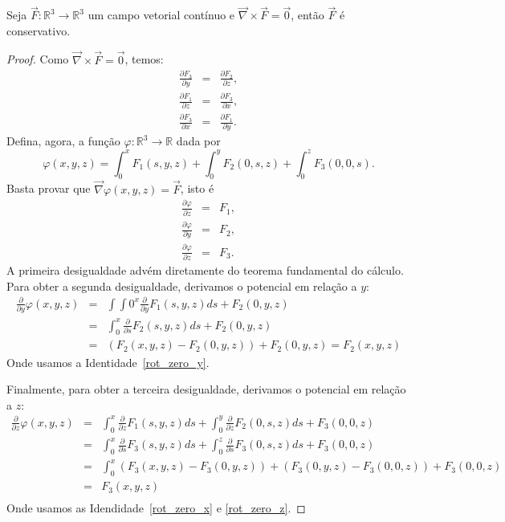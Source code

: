 \begin{teo} Seja $\vec{F}:\mathbb{R}^3\to\mathbb{R}^3$ um campo vetorial contínuo e $\vec{\nabla}\times \vec{F}=\vec{0}$, então $\vec{F}$ é conservativo.
 \end{teo}
\begin{proof} Como $\vec{\nabla}\times \vec{F}=\vec{0}$, temos:
\begin{eqnarray}
 \frac{\partial F_3}{\partial y} &=&\frac{\partial F_2}{\partial z}\label{rot_zero_x},\\
 \frac{\partial F_1}{\partial z} &=&\frac{\partial F_3}{\partial x}\label{rot_zero_y},\\
 \frac{\partial F_3}{\partial x} &=&\frac{\partial F_1}{\partial y}\label{rot_zero_z}.
\end{eqnarray}
Defina, agora, a função $\varphi:\mathbb{R}^3\to\mathbb{R}$ dada por
$$\varphi(x,y,z)=\int_0^xF_1(s,y,z) + \int_0^yF_2(0,s,z)+\int_0^zF_3(0,0,s).$$
Basta provar que $\vec{\nabla}\varphi(x,y,z)=\vec{F}$, isto é
\begin{eqnarray}
 \frac{\partial \varphi}{\partial z} &=&F_1,\label{rot_zero_der_x}\\
 \frac{\partial \varphi}{\partial y} &=&F_2,\label{rot_zero_der_y}\\
 \frac{\partial \varphi}{\partial z} &=&F_3\label{rot_zero_der_z}.
\end{eqnarray}
A primeira desigualdade advém diretamente do teorema fundamental do cálculo. Para obter a segunda desigualdade, derivamos o potencial em relação a $y$:
\begin{eqnarray*}
\frac{\partial }{\partial y}\varphi(x,y,z)&=&\int\int 0^x \frac{\partial }{\partial y}F_1(s,y,z)ds+ F_2(0,y,z)\\
&=&\int_0^x \frac{\partial }{\partial s}F_2(s,y,z)ds+ F_2(0,y,z)\\
&=&\left(F_2(x,y,z)-F_2(0,y,z)\right)+ F_2(0,y,z) = F_2(x,y,z)
\end{eqnarray*}
Onde usamos a Identidade~\ref{rot_zero_y}.

Finalmente, para obter a terceira desigualdade, derivamos o potencial em relação a $z$:
\begin{eqnarray*}
\frac{\partial }{\partial z}\varphi(x,y,z)&=&\int_0^x \frac{\partial }{\partial z}F_1(s,y,z)ds + \int_0^y \frac{\partial }{\partial z}F_2(0,s,z)ds+F_3(0,0,z)\\
&=&\int_0^x \frac{\partial }{\partial s}F_3(s,y,z)ds + \int_0^z \frac{\partial }{\partial s}F_3(0,s,z)ds+F_3(0,0,z)\\
&=&\int_0^x \left(F_3(x,y,z)-F_3(0,y,z)\right) + \left(F_3(0,y,z)-F_3(0,0,z)\right)+F_3(0,0,z)\\
&=&F_3(x,y,z)\\
\end{eqnarray*}
  Onde usamos as Idendidade~\ref{rot_zero_x} e \ref{rot_zero_z}.
\end{proof}


